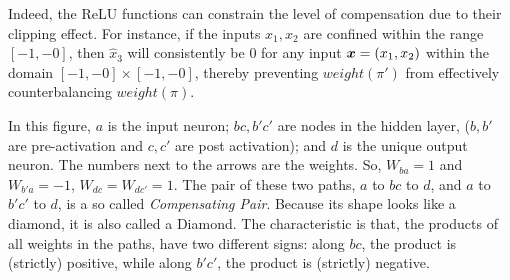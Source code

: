  
Indeed, the ReLU functions can constrain the level of compensation due to their clipping effect. For instance, if the inputs $x_1, x_2$ are confined within the range $[-1,-0]$, then $\hat{x}_3$ will consistently be 0 for any input $\boldsymbol{x}=(x_1,x_2)$ within the domain $[-1,-0] \times [-1,-0]$, thereby preventing $weight(\pi')$ from effectively counterbalancing $weight(\pi)$.




\iffalse
\vspace*{2ex}

\begin{figure}
	\centering
\end{figure}

\vspace*{2ex}

In this figure, $a$ is the input neuron; $bc,b'c'$ are nodes in the hidden layer, ($b,b'$ are pre-activation and $c,c'$ are post activation); and $d$ is the unique output neuron. The numbers next to the arrows are the weights. So, $W_{ba}=1$ and $W_{b'a}=-1$, $W_{dc}=W_{dc'}=1$. The pair of these two paths, $a$ to $bc$ to $d$, and $a$ to $b'c'$ to $d$, is a so called \emph{Compensating Pair}. Because its shape looks like a diamond, it is also called a Diamond. The characteristic is that, the products of all weights in the paths, have two different signs: along $bc$, the product is (strictly) positive, while along $b'c'$, the product is (strictly) negative. 

